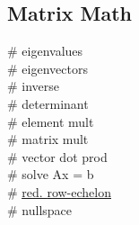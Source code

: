 \subsection*{Matrix Math}
 \# eigenvalues \\
 \# eigenvectors \\
 \# inverse \\
 \# determinant \\
 \# element mult \\
 \# matrix mult \\
 \# vector dot prod \\
 \# solve Ax = b \\
 \# \href{https://juliapackages.com/packages/rowechelon}{\ul{r}ed. \ul{r}ow-\ul{e}chelon} \\
 \# nullspace \\

